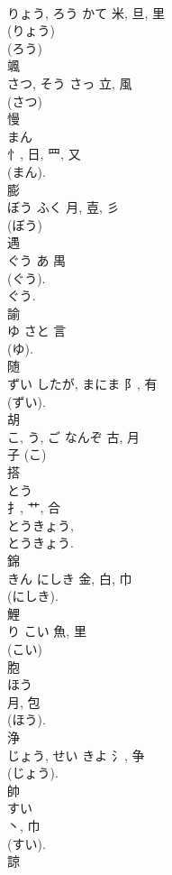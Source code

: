 \documentclass[8pt]{extreport}
\begin{document}
\begin{CJK}{UTF8}{min}
\\	りょう, ろう	かて	米, 旦, 里	
\\	(りょう) 
\\	(ろう) 
\\	颯	
\\	さつ, そう	さっ	立, 風	
\\	(さつ) 
\\	慢	
\\	まん	
\\	忄, 日, 罒, 又	
\\	(まん). 
\\	膨	
\\	ぼう	ふく	月, 壴, 彡	
\\	(ぼう) 
\\	遇	
\\	ぐう	あ	禺		
\\	(ぐう).	
\\	ぐう. 
\\	諭	
\\	ゆ	さと	言		
\\	(ゆ). 
\\	随	
\\	ずい	したが, まにま	阝, 有		
\\	(ずい).	
\\	胡	
\\	こ, う, ご	なんぞ	古, 月	
\\	子 (こ) 
\\	搭	
\\	とう	
\\	扌, 艹, 合	
\\	とうきょう, 
\\	とうきょう.	
\\	錦	
\\	きん	にしき	金, 白, 巾	
\\	(にしき). 
\\	鯉	
\\	り	こい	魚, 里	
\\	(こい) 
\\	胞	
\\	ほう	
\\	月, 包	
\\	(ほう). 
\\	浄	
\\	じょう, せい	きよ	氵, 争	
\\	(じょう). 
\\	帥	
\\	すい	
\\	丶, 巾		
\\	(すい).	
\\	諒	

\end{CJK}
\end{document}
